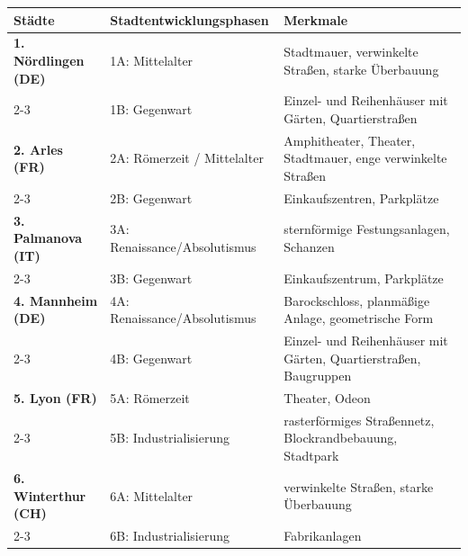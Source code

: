 \begin{myexercise}
\begin{myanswer}
\begin{table}[H]
\centering
\begin{tabular}{p{4cm}|p{4cm}|p{5cm}}
\textbf{Städte} & \textbf{Stadtentwicklungsphasen} & \textbf{Merkmale} \\ \midrule\midrule
\textbf{1. Nördlingen (DE)} & 1A: Mittelalter & Stadtmauer, verwinkelte Straßen, starke Überbauung \\ \cline{2-3}
& 1B: Gegenwart & Einzel- und Reihenhäuser mit Gärten, Quartierstraßen \\ \midrule
\textbf{2. Arles (FR)} & 2A: Römerzeit / Mittelalter & Amphitheater, Theater, Stadtmauer, enge verwinkelte Straßen \\ \cline{2-3}
& 2B: Gegenwart & Einkaufszentren, Parkplätze \\ \midrule
\textbf{3. Palmanova (IT)} & 3A: Renaissance/Absolutismus & sternförmige Festungsanlagen, Schanzen \\ \cline{2-3}
& 3B: Gegenwart & Einkaufszentrum, Parkplätze \\ \midrule
\textbf{4. Mannheim (DE)} & 4A: Renaissance/Absolutismus & Barockschloss, planmäßige Anlage, geometrische Form \\ \cline{2-3}
& 4B: Gegenwart & Einzel- und Reihenhäuser mit Gärten, Quartierstraßen, Baugruppen \\ \midrule
\textbf{5. Lyon (FR)} & 5A: Römerzeit & Theater, Odeon \\ \cline{2-3}
& 5B: Industrialisierung & rasterförmiges Straßennetz, Blockrandbebauung, Stadtpark \\ \midrule
\textbf{6. Winterthur (CH)} & 6A: Mittelalter & verwinkelte Straßen, starke Überbauung \\ \cline{2-3}
& 6B: Industrialisierung & Fabrikanlagen \\
\end{tabular}
\end{table}
\end{myanswer}
\end{myexercise}



